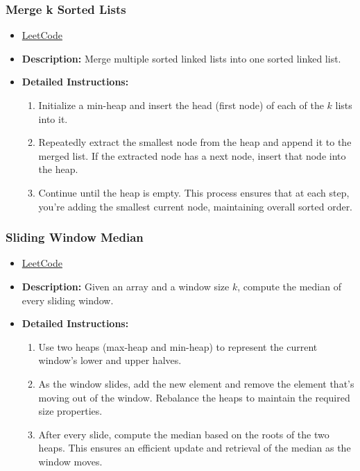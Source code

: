 \subsubsection{Merge k Sorted Lists}
\begin{itemize}
    \item \href{https://leetcode.com/problems/merge-k-sorted-lists/}{LeetCode}
    \item \textbf{Description:} Merge multiple sorted linked lists into one sorted linked list.
    \item \textbf{Detailed Instructions:}
    \begin{enumerate}
        \item Initialize a min-heap and insert the head (first node) of each of the $k$ lists into it.
        \item Repeatedly extract the smallest node from the heap and append it to the merged list. If the extracted node has a next node, insert that node into the heap.
        \item Continue until the heap is empty. This process ensures that at each step, you’re adding the smallest current node, maintaining overall sorted order.
    \end{enumerate}
\end{itemize}

\subsubsection{Sliding Window Median}
\begin{itemize}
    \item \href{https://leetcode.com/problems/sliding-window-median/}{LeetCode}
    \item \textbf{Description:} Given an array and a window size $k$, compute the median of every sliding window.
    \item \textbf{Detailed Instructions:}
    \begin{enumerate}
        \item Use two heaps (max-heap and min-heap) to represent the current window’s lower and upper halves.
        \item As the window slides, add the new element and remove the element that’s moving out of the window. Rebalance the heaps to maintain the required size properties.
        \item After every slide, compute the median based on the roots of the two heaps. This ensures an efficient update and retrieval of the median as the window moves.
    \end{enumerate}
\end{itemize}